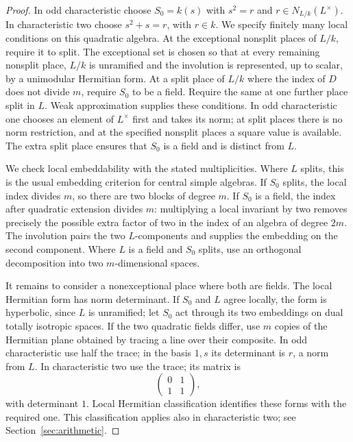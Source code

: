 \begin{proof}
In odd characteristic choose $S_0=k(s)$ with $s^2=r$ and
$r\in N_{L/k}(L^\times)$.  In characteristic two choose
$s^2+s=r$, with $r\in k$.  We specify finitely many local conditions on
this quadratic algebra.  At the exceptional nonsplit places of $L/k$,
require it to split.  The exceptional set is chosen so that at every
remaining nonsplit place, $L/k$ is unramified and the involution is
represented, up to scalar, by a unimodular Hermitian form.  At a split
place of $L/k$ where the index of $D$ does not divide $m$, require $S_0$
to be a field.  Require the same at one further place split in $L$.
Weak approximation supplies these conditions.  In odd characteristic
one chooses an element of $L^\times$ first and takes its norm; at split
places there is no norm restriction, and at the specified nonsplit
places a square value is available.  The extra split place ensures that
$S_0$ is a field and is distinct from $L$.

We check local embeddability with the stated multiplicities.  Where
$L$ splits, this is the usual embedding criterion for central simple
algebras.  If $S_0$ splits, the local index divides $m$, so there are two
blocks of degree $m$.  If $S_0$ is a field, the index after quadratic
extension divides $m$: multiplying a local invariant by two removes
precisely the possible extra factor of two in the index of an algebra
of degree $2m$.  The involution pairs the two $L$-components and supplies
the embedding on the second component.  Where $L$ is a field and $S_0$
splits, use an orthogonal decomposition into two $m$-dimensional spaces.

It remains to consider a nonexceptional place where both are fields.
The local Hermitian form has norm determinant.  If $S_0$ and $L$ agree
locally, the form is hyperbolic, since $L$ is unramified; let $S_0$ act
through its two embeddings on dual totally isotropic spaces.  If the
two quadratic fields differ, use $m$ copies of the Hermitian plane
obtained by tracing a line over their composite.  In odd characteristic
use half the trace; in the basis $1,s$ its determinant is $r$, a norm
from $L$.  In characteristic two use the trace; its matrix is
\[
                     \begin{pmatrix}0&1\\1&1\end{pmatrix},
\]
with determinant $1$.  Local Hermitian classification identifies these
forms with the required one.  This classification applies also in
characteristic two; see Section~\ref{sec:arithmetic}.


\end{proof}
